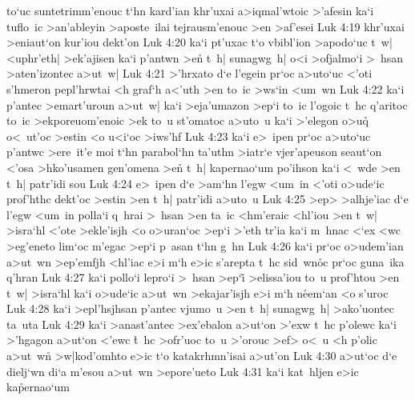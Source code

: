 to`uc
suntetrimm'enouc
t`hn
kard'ian
khr'uxai
a>iqmal'wtoic
>'afesin
ka`i
tuflo~ic
>an'ableyin
>aposte~ilai
tejrausm'enouc
>en
>af'esei\bibvsend
\vs Luk 4:19
khr'uxai
>eniaut`on
kur'iou
dekt'on\bibvsend
\vs Luk 4:20
ka`i
pt'uxac
t`o
vbibl'ion
>apodo`uc
t~w|
<uphr'eth|
>ek'ajisen
ka`i
p'antwn
>en\r{}
t~h|
sunagwg~h|
o<i
>ofjalmo`i
>~hsan
>aten'izontec
a>ut~w|\bibvsend
\vs Luk 4:21
>'hrxato
d`e
l'egein
pr`oc
a>uto`uc
<'oti
s'hmeron
pepl'hrwtai
<h
graf`h
a<'uth
>en
to~ic
>ws`in
<um~wn\bibvsend
\vs Luk 4:22
ka`i
p'antec
>emart'uroun
a>ut~w|
ka`i
>eja'umazon
>ep`i
to~ic
l'ogoic
t~hc
q'aritoc
to~ic
>ekporeuom'enoic
>ek
to~u
st'omatoc
a>uto~u
ka`i
>'elegon
o>uq\r{}
o<~ut'oc
>estin
<o
u<i`oc
>iws'hf\bibvsend
\vs Luk 4:23
ka`i
e>~ipen
pr`oc
a>uto`uc
p'antwc
>ere~it'e
moi
t`hn
parabol`hn
ta'uthn
>iatr`e
vjer'apeuson
seaut`on
<'osa
>hko'usamen
gen'omena
>en\r{}
t~h|
kapernao`um
po'ihson
ka`i
<~wde
>en
t~h|
patr'idi
sou\bibvsend
\vs Luk 4:24
e>~ipen
d`e
>am`hn
l'egw
<um~in
<'oti
o>ude`ic
prof'hthc
dekt'oc
>estin
>en
t~h|
patr'idi
a>uto~u\bibvsend
\vs Luk 4:25
>ep>
>alhje'iac
d`e
l'egw
<um~in
polla`i
q~hrai
>~hsan
>en
ta~ic
<hm'eraic
<hl'iou
>en
t~w|
>isra`hl
<'ote
>ekle'isjh
<o
o>uran`oc
>ep`i
>'eth
tr'ia
ka`i
m~hnac
<`ex
<wc
>eg'eneto
lim`oc
m'egac
>ep`i
p~asan
t`hn
g~hn\bibvsend
\vs Luk 4:26
ka`i
pr`oc
o>udem'ian
a>ut~wn
>ep'emfjh
<hl'iac
e>i
m`h
e>ic
s'arepta
t~hc
sid~wn\r{o}c
pr`oc
guna~ika
q'hran\bibvsend
\vs Luk 4:27
ka`i
pollo`i
lepro`i
>~hsan
>ep`i\r{}
>elissa'iou
to~u
prof'htou
>en
t~w|
>isra`hl
ka`i
o>ude`ic
a>ut~wn
>ekajar'isjh
e>i
m`h
n\r{e}em`an
<o
s'uroc\bibvsend
\vs Luk 4:28
ka`i
>epl'hsjhsan
p'antec
vjumo~u
>en
t~h|
sunagwg~h|
>ako'uontec
ta~uta\bibvsend
\vs Luk 4:29
ka`i
>anast'antec
>ex'ebalon
a>ut`on
>'exw
t~hc
p'olewc
ka`i
>'hgagon
a>ut`on
<'ewc
\r{t}~hc
>ofr'uoc
to~u
>'orouc
>ef>
o<~u
<h
p'olic
a>ut~wn\r{}
>w|kod'omhto
e>ic
t`o
katakrhmn'isai
a>ut'on\bibvsend
\vs Luk 4:30
a>ut`oc
d`e
dielj`wn
di`a
m'esou
a>ut~wn
>epore'ueto\bibvsend
\vs Luk 4:31
ka`i
kat~hljen
e>ic
ka\r{p}ernao`um
